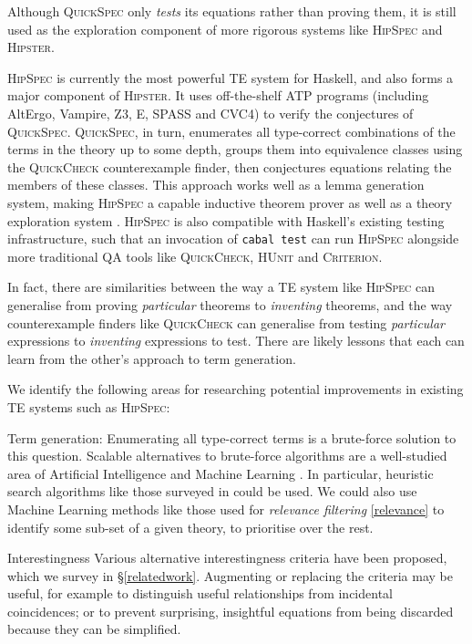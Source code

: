 \documentclass[]{article}
\begin{document}
Although \textsc{QuickSpec} only \emph{tests} its equations rather than proving them, it is still used as the exploration component of more rigorous systems like \textsc{HipSpec} and \textsc{Hipster}.

\textsc{HipSpec} is currently the most powerful TE system for Haskell, and also forms a major component of \textsc{Hipster}. It uses off-the-shelf ATP programs (including AltErgo, Vampire, Z3, E, SPASS and CVC4) to verify the conjectures of \textsc{QuickSpec}. \textsc{QuickSpec}, in turn, enumerates all type-correct combinations of the terms in the theory up to some depth, groups them into equivalence classes using the \textsc{QuickCheck} counterexample finder, then conjectures equations relating the members of these classes. This approach works well as a lemma generation system, making \textsc{HipSpec} a capable inductive theorem prover as well as a theory exploration system \cite{claessen2013automating}. \textsc{HipSpec} is also compatible with Haskell's existing testing infrastructure, such that an invocation of \texttt{cabal test} can run \textsc{HipSpec} alongside more traditional QA tools like \textsc{QuickCheck}, \textsc{HUnit} and \textsc{Criterion}.

In fact, there are similarities between the way a TE system like \textsc{HipSpec} can generalise from proving \emph{particular} theorems to \emph{inventing} theorems, and the way counterexample finders like \textsc{QuickCheck} can generalise from testing \emph{particular} expressions to \emph{inventing} expressions to test. There are likely lessons that each can learn from the other's approach to term generation.

We identify the following areas for researching potential improvements in existing TE systems such as \textsc{HipSpec}:

\begin{description}
\item{Term generation}:
  Enumerating all type-correct terms is a brute-force solution to this question. Scalable alternatives to brute-force algorithms are a well-studied area of Artificial Intelligence and Machine Learning \iffalse TODO: Related work reference \fi. In particular, heuristic search algorithms like those surveyed in \cite{blum2011hybrid} could be used.
  We could also use Machine Learning methods like those used for \emph{relevance filtering} \ref{relevance} to identify some sub-set of a given theory, to prioritise over the rest.

\item{Interestingness}
  Various alternative interestingness criteria have been proposed, which we survey in \S \ref{relatedwork}. Augmenting or replacing the criteria may be useful, for example to distinguish useful relationships from incidental coincidences; or to prevent surprising, insightful equations from being discarded because they can be simplified.
\end{description}
\end{document}
